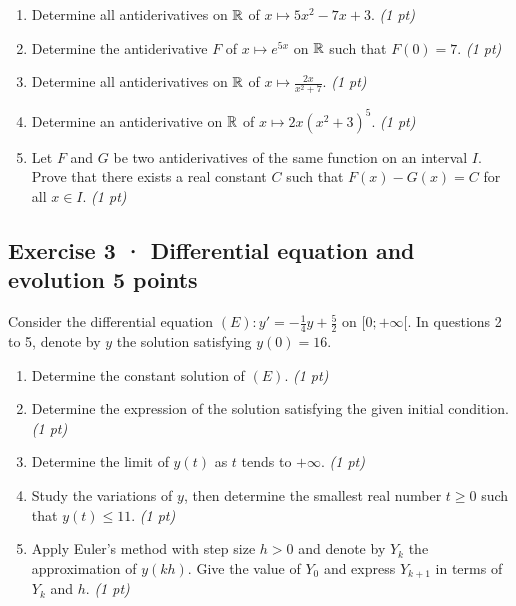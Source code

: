 \begin{enumerate}

\item Determine all antiderivatives on $\mathbb R$ of $x\mapsto 5x^2-7x+3$. \hfill\textit{(1 pt)}

\item Determine the antiderivative $F$ of $x\mapsto e^{5x}$ on $\mathbb R$ such that $F(0)=7$. \hfill\textit{(1 pt)}

\item Determine all antiderivatives on $\mathbb R$ of $x\mapsto\frac{2x}{x^2+7}$. \hfill\textit{(1 pt)}

\item Determine an antiderivative on $\mathbb R$ of $x\mapsto2x(x^2+3)^{5}$. \hfill\textit{(1 pt)}

\item Let $F$ and $G$ be two antiderivatives of the same function on an interval $I$. Prove that there exists a real constant $C$ such that $F(x)-G(x)=C$ for all $x\in I$. \hfill\textit{(1 pt)}

\end{enumerate}

\clearpage{}\par

\subsection*{Exercise 3 · Differential equation and evolution \hfill 5 points}Consider the differential equation $(E):y'=-\frac1{4}y+\frac{5}{2}$ on $[0;+\infty[$. In questions 2 to 5, denote by $y$ the solution satisfying $y(0)=16$.

\begin{enumerate}

\item Determine the constant solution of $(E)$. \hfill\textit{(1 pt)}

\item Determine the expression of the solution satisfying the given initial condition. \hfill\textit{(1 pt)}

\item Determine the limit of $y(t)$ as $t$ tends to $+\infty$. \hfill\textit{(1 pt)}

\item Study the variations of $y$, then determine the smallest real number $t\ge0$ such that $y(t)\le11$. \hfill\textit{(1 pt)}

\item Apply Euler's method with step size $h>0$ and denote by $Y_k$ the approximation of $y(kh)$. Give the value of $Y_0$ and express $Y_{k+1}$ in terms of $Y_k$ and $h$. \hfill\textit{(1 pt)}

\end{enumerate}

